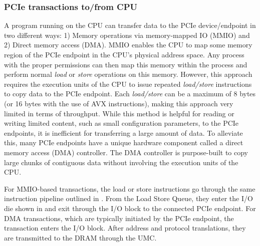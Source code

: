 \subsubsection{PCIe transactions to/from CPU}
\label{subsubsec:interconnect-sc-background-cpu-arch-pcie-transactions}

A program running on the CPU can transfer data to the PCIe device/endpoint in two different ways: 1) Memory operations via memory-mapped IO (MMIO) and 2) Direct memory access (DMA).
MMIO enables the CPU to map some memory region of the PCIe endpoint in the CPU's physical address space.
Any process with the proper permissions can then map this memory within the process and perform normal \textit{load} or \textit{store} operations on this memory.
However, this approach requires the execution units of the CPU to issue repeated \textit{load/store} instructions to copy data to the PCIe endpoint.
Each \textit{load/store} can be a maximum of 8 bytes (or 16 bytes with the use of AVX instructions), making this approach very limited in terms of throughput.
While this method is helpful for reading or writing limited content, such as small configuration parameters, to the PCIe endpoints, it is inefficient for transferring a large amount of data.
To alleviate this, many PCIe endpoints have a unique hardware component called a direct memory access (DMA) controller.
The DMA controller is purpose-built to copy large chunks of contiguous data without involving the execution units of the CPU.

For MMIO-based transactions, the load or store instructions go through the same instruction pipeline outlined in . 
From the Load Store Queue, they enter the I/O die shown in  and exit through the I/O block to the connected PCIe endpoint.
For DMA transactions, which are typically initiated by the PCIe endpoint, the transaction enters the I/O block. 
After address and protocol translations, they are transmitted to the DRAM through the UMC.